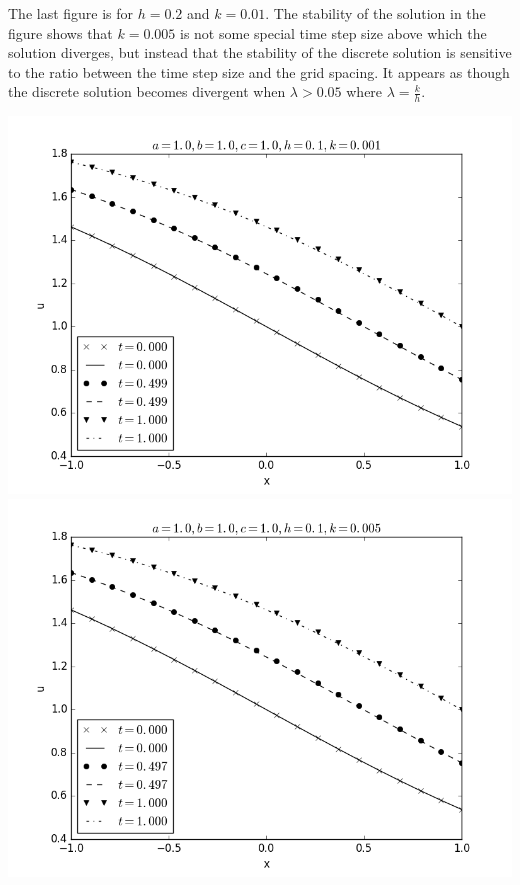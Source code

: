 \documentclass[a4paper,10pt]{article}
\newcommand{\fw}{\linewidth}
\begin{document}
	The last figure is for $h = 0.2$ and $k = 0.01$.
	The stability of the solution in the figure shows that $k = 0.005$ is not some special time step size above which the solution diverges, but instead that the stability of the discrete solution is sensitive to the ratio between the time step size and the grid spacing.
	It appears as though the discrete solution becomes divergent when $\lambda > 0.05$ where $\lambda = \frac{k}{h}$.
	
	{
		\centering
		\includegraphics[width=\fw]{vb_a-100_b-100_c-100_h-0100_k-0001}
		\vspace{0.25in}
		\includegraphics[width=\fw]{vb_a-100_b-100_c-100_h-0100_k-0005}
}
\end{document}
